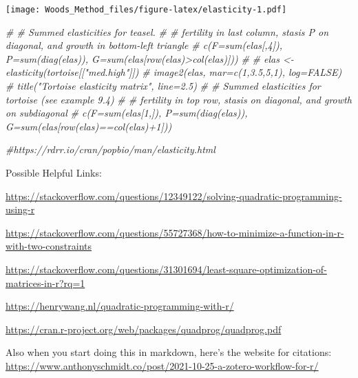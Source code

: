 \documentclass[
]{article}
\newenvironment{Shaded}{\begin{snugshade}}{\end{snugshade}}
\newcommand{\CommentTok}[1]{\textcolor[rgb]{0.56,0.35,0.01}{\textit{#1}}}
\begin{document}
\texttt{[image: Woods\_Method\_files/figure-latex/elasticity-1.pdf]}

\begin{Shaded}
\begin{Highlighting}[]
\CommentTok{\# \# Summed elasticities for teasel.}
\CommentTok{\# \# fertility in last column, stasis P on diagonal, and growth in bottom{-}left triangle}
\CommentTok{\# c(F=sum(elas[,4]), P=sum(diag(elas)), G=sum(elas[row(elas)\textgreater{}col(elas)]))}
\CommentTok{\# }
\CommentTok{\# elas \textless{}{-} elasticity(tortoise[["med.high"]])}
\CommentTok{\# image2(elas, mar=c(1,3.5,5,1),  log=FALSE)}
\CommentTok{\#  title("Tortoise elasticity matrix", line=2.5)}
\CommentTok{\# \# Summed elasticities for tortoise (see example 9.4)}
\CommentTok{\# \# fertility in top row, stasis on diagonal, and growth on subdiagonal}
\CommentTok{\# c(F=sum(elas[1,]), P=sum(diag(elas)), G=sum(elas[row(elas)==col(elas)+1]))}

\CommentTok{\#https://rdrr.io/cran/popbio/man/elasticity.html}
\end{Highlighting}
\end{Shaded}

Possible Helpful Links:

\url{https://stackoverflow.com/questions/12349122/solving-quadratic-programming-using-r}

\url{https://stackoverflow.com/questions/55727368/how-to-minimize-a-function-in-r-with-two-constraints}

\url{https://stackoverflow.com/questions/31301694/least-square-optimization-of-matrices-in-r?rq=1}

\url{https://henrywang.nl/quadratic-programming-with-r/}

\url{https://cran.r-project.org/web/packages/quadprog/quadprog.pdf}

Also when you start doing this in markdown, here's the website for
citations:
\url{https://www.anthonyschmidt.co/post/2021-10-25-a-zotero-workflow-for-r/}
\end{document}
